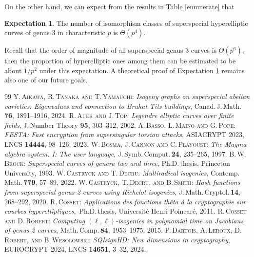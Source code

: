 \documentclass{amsart}
\theoremstyle{definition}
\newtheorem{Exp}[Def]{Expectation}
\theoremstyle{plain}
\begin{document}
On the other hand, we can expect from the results in Table \ref{enumerate} that
\begin{Exp}\label{expe}
The number of isomorphism classes of superspecial hyperelliptic curves of genus $3$ in characteristic $p$ is $\Theta(p^4)$. 
\end{Exp}
\noindent Recall that the order of magnitude of all superspecial genus-3 curves is $\Theta(p^6)$, then the proportion of hyperelliptic ones among them can be estimated to be about $1/p^2$ under this expectation.
A theoretical proof of Expectation \ref{expe} remains also one of our future goals.

\begin{thebibliography}{99}
 \textsc{Y.\,Aikawa, R.\,Tanaka and T.\,Yamauchi}: \textit{Isogeny graphs on superspecial abelian varieties: Eigenvalues and connection to Bruhat-Tits buildings}, Canad.\,J.\,Math.\,{\bf 76}, 1891--1916, 2024.
 \textsc{R.\,Auer and J.\,Top}: \textit{Legendre elliptic curves over finite fields}, J.\,Number Theory {\bf 95}, 303--312, 2002.
 \textsc{A.\,Basso, L.\,Maino and G.\,Pope}: \textit{FESTA: Fast encryption from supersingular torsion attacks}, ASIACRYPT 2023, LNCS {\bf 14444}, 98--126, 2023.
 \textsc{W.\,Bosma, J.\,Cannon and C.\,Playoust}: \textit{The Magma algebra system. I: The user language}, J.\,Symb.\,Comput.\,{\bf 24}, 235--265, 1997.
 \textsc{B.\,W.\,Brock}: \textit{Superspecial curves of genera two and three}, Ph.D.\,thesis, Princeton University, 1993.
 \textsc{W.\,Castryck and T.\,Decru}: \textit{Multiradical isogenies}, Contemp.\,Math.\,{\bf 779}, 57--89, 2022.
 \textsc{W.\,Castryck, T.\,Decru, and B.\,Smith}: \textit{Hash functions from superspecial genus-2 curves using Richelot isogenies}, J.\,Math.\,Cryptol.\,{\bf 14}, 268--292, 2020.
 \textsc{R.\,Cosset}: \textit{Applications des fonctions thêta à la cryptographie sur courbes hyperelliptiques},\ Ph.D.\,thesis, Université Henri Poincaré, 2011.
 \textsc{R.\,Cosset and D.\,Robert}: \textit{Computing $(\ell,\ell)$-isogenies in polynomial time on Jacobians of genus 2 curves}, Math.\,Comp.\,{\bf 84}, 1953--1975, 2015.
 \textsc{P.\,Dartois, A.\,Leroux, D.\,Robert, and B.\,Wesolowski}: \textit{SQIsignHD: New dimensions in cryptography}, EUROCRYPT 2024, LNCS {\bf 14651}, 3--32, 2024.

\end{thebibliography}
\end{document}
